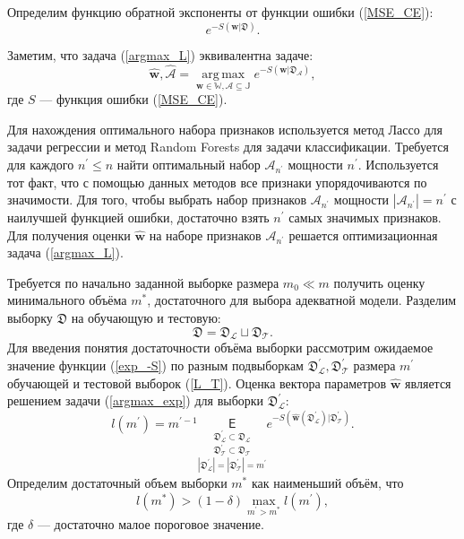 \documentclass[12pt, a4paper]{scrartcl}
\DeclareMathOperator*{\argmax}{arg\,max}
\theoremstyle{plain}
\theoremstyle{definition}
\begin{document}
Определим функцию обратной экспоненты от функции ошибки (\ref{MSE_CE}):
\begin{equation}\label{exp_-S}
e^{-S(\mathbf{w} | \mathfrak{D})}.
\end{equation}

Заметим, что задача (\ref{argmax_L}) эквивалентна задаче:
\begin{equation}\label{argmax_exp}
\hat{\textbf{w}}, \hat{\mathcal{A}} = \argmax\limits_{\mathbf{w} \in \mathbb{W}, \mathcal{A} \subseteq \mathbb{J}} e^{-S(\mathbf{w} | \mathfrak{D}_{\mathcal{A}})},
\end{equation}
где $S$ --- функция ошибки (\ref{MSE_CE}).

Для нахождения оптимального набора признаков используется метод Лассо для задачи регрессии и метод Random Forests для задачи классификации. Требуется для каждого $n^{\prime} \leq n$ найти оптимальный набор $\mathcal{A}_{n^{\prime}}$ мощности $n^{\prime}$. Используется тот факт, что с помощью данных методов все признаки упорядочиваются по значимости. Для того, чтобы выбрать набор признаков $\mathcal{A}_{n^{\prime}}$ мощности $|\mathcal{A}_{n^{\prime}}| = n^{\prime}$ с наилучшей функцией ошибки, достаточно взять $n^{\prime}$ самых значимых признаков.  Для получения оценки $\hat{\mathbf{w}}$ на наборе признаков $\mathcal{A}_{n^{\prime}}$ решается оптимизационная задача (\ref{argmax_L}).

Требуется по начально заданной выборке размера $m_0 \ll m$ получить оценку минимального объёма $m^{*}$, достаточного для выбора адекватной модели. Разделим выборку $\mathfrak{D}$ на обучающую и тестовую:
\begin{equation}\label{L_T}
\mathfrak{D} = \mathfrak{D}_{\mathcal{L}} \sqcup \mathfrak{D}_{\mathcal{T}}.
\end{equation}
Для введения понятия достаточности объёма  выборки рассмотрим ожидаемое значение функции (\ref{exp_-S}) по разным подвыборкам $\mathfrak D^{\prime}_{\mathcal{L}}, \mathfrak D^{\prime}_{\mathcal{T}}$ размера $m^{\prime}$ обучающей и тестовой выборок (\ref{L_T}). Оценка вектора параметров $\hat{\mathbf{w}}$ является решением задачи (\ref{argmax_exp}) для выборки $\mathfrak D^{\prime}_{\mathcal{L}}$:
\begin{equation}\label{l}
l(m^{\prime}) = m^{\prime-1}\underset{|\mathfrak D^{\prime}_{\mathcal{L}}| = |\mathfrak D^{\prime}_{\mathcal{T}}| = m^{\prime}}{\underset{\mathfrak D^{\prime}_{\mathcal{T}} \subset \mathfrak D_{\mathcal{T}}}{\underset{\mathfrak D^{\prime}_{\mathcal{L}} \subset \mathfrak D_{\mathcal{L}}}{\mathsf E}}} e^{-S(\hat{\mathbf{w}}(\mathfrak{D}^{\prime}_{\mathcal{L}}) | \mathfrak{D}^{\prime}_{\mathcal{T}})}.
\end{equation}
Определим достаточный объем выборки $m^*$ как наименьший объём, что
\begin{equation}\label{m_star}
l(m^*) > (1 - \delta)\max\limits_{m^{\prime} > m^*}l(m^{\prime}),
\end{equation}
где $\delta$ --- достаточно малое пороговое значение.
\end{document}
